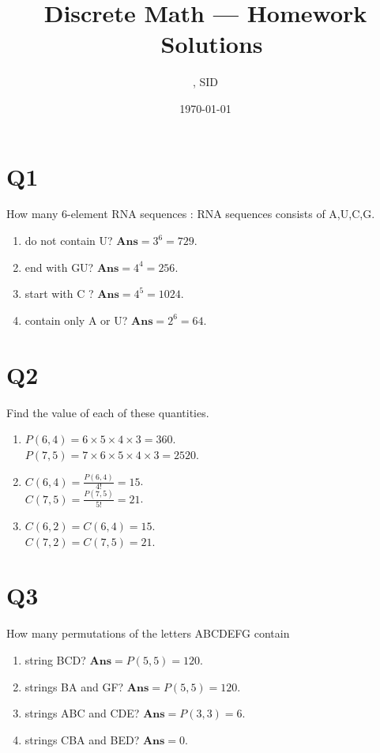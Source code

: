 \documentclass[11pt]{article}
\title{Discrete Math --- Homework \Homework \ Solutions}
\author{\Name, SID \SID}
\date{\today}
\newenvironment{qparts}{\begin{enumerate}[{(}a{)}]}{\end{enumerate}}
\newenvironment{solution}{{\\\bf Solution}:}{\smallskip}
\begin{document}
\maketitle

\section*{Q1}
How many 6-element RNA sequences
\begin{solution}
    RNA sequences consists of A,U,C,G.
    \begin{qparts}
        \item do not contain U?
        $\textbf{Ans}=3^{6}=729$.
        
        \item end with GU?
        $\textbf{Ans}=4^{4}=256$.

        \item start with C ?
        $\textbf{Ans}=4^{5}=1024$.

        \item contain only A or U?
        $\textbf{Ans}=2^{6}=64$.
    \end{qparts}
\end{solution}

\section*{Q2}
Find the value of each of these quantities.
\begin{qparts}
    
    \item $P(6,4)=6\times 5\times 4\times 3=360$.\\
    $P(7,5)=7\times 6\times 5\times 4\times 3=2520$.
    
    \item $C(6,4)=\frac{P(6,4)}{4!}=15$.\\
    $C(7,5)=\frac{P(7,5)}{5!}=21$.
    
    \item $C(6,2)=C(6,4)=15$.\\
    $C(7,2)=C(7,5)=21$.
\end{qparts}

\section*{Q3}
How many permutations of the letters ABCDEFG contain
\begin{qparts}
    
    \item string BCD?
    $\textbf{Ans}=P(5,5)=120$.
    \item strings BA and GF?
    $\textbf{Ans}=P(5,5)=120$.
    \item strings ABC and CDE?
    $\textbf{Ans}=P(3,3)=6$.
    \item strings CBA and BED?
    $\textbf{Ans}=0$.
\end{qparts}
\end{document}

